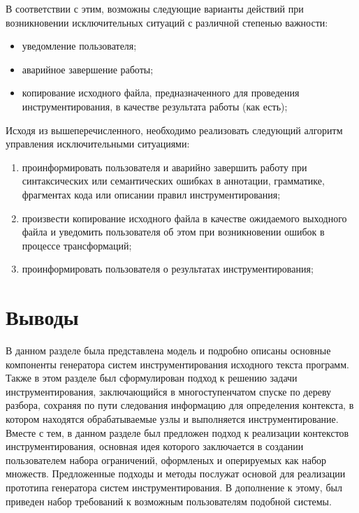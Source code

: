 В соответствии с этим, возможны следующие варианты действий при возникновении исключительных ситуаций с различной степенью важности:

\begin{itemize}[noitemsep]
  \item уведомление пользователя;
  \item аварийное завершение работы;
  \item копирование исходного файла, предназначенного для проведения инструментирования, в качестве результата работы (как есть);
\end{itemize}

Исходя из вышеперечисленного, необходимо реализовать следующий алгоритм управления исключительными ситуациями:
\begin{enumerate}[noitemsep]
  \item проинформировать пользователя и аварийно завершить работу при синтаксических или семантических ошибках в аннотации, грамматике, фрагментах кода или описании правил инструментирования;
  \item произвести копирование исходного файла в качестве ожидаемого выходного файла и уведомить пользователя об этом при возникновении ошибок в процессе трансформаций;
  \item проинформировать пользователя о результатах инструментирования;
\end{enumerate}

\section{Выводы}

В данном разделе была представлена модель и подробно описаны основные компоненты генератора систем инструментирования исходного текста программ.
Также в этом разделе был сформулирован подход к решению задачи инструментирования, заключающийся в многоступенчатом спуске по дереву разбора, сохраняя по пути следования информацию для определения контекста, в котором находятся обрабатываемые узлы и выполняется инструментирование.
Вместе с тем, в данном разделе был предложен подход к реализации контекстов инструментирования, основная идея которого заключается в создании пользователем набора ограничений, оформленых и оперируемых как набор множеств.
Предложенные подходы и методы послужат основой для реализации прототипа генератора систем инструментирования.
В дополнение к этому, был приведен набор требований к возможным пользователям подобной системы.
